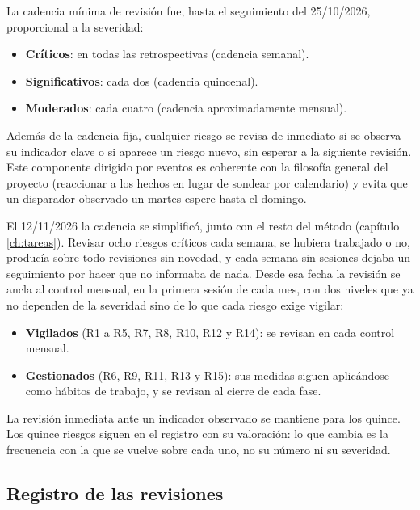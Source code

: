 La cadencia mínima de revisión fue, hasta el seguimiento del 25/10/2026, proporcional a la severidad:

\begin{itemize}
  \item \textbf{Críticos}: en todas las retrospectivas (cadencia semanal).
  \item \textbf{Significativos}: cada dos  (cadencia quincenal).
  \item \textbf{Moderados}: cada cuatro  (cadencia aproximadamente mensual).
\end{itemize}

Además de la cadencia fija, cualquier riesgo se revisa de inmediato si se observa su indicador clave o si aparece un riesgo nuevo, sin esperar a la siguiente revisión.
Este componente dirigido por eventos es coherente con la filosofía general del proyecto (reaccionar a los hechos en lugar de sondear por calendario) y evita que un disparador observado un martes espere hasta el domingo.

El 12/11/2026 la cadencia se simplificó, junto con el resto del método (capítulo \ref{ch:tareas}).
Revisar ocho riesgos críticos cada semana, se hubiera trabajado o no, producía sobre todo revisiones sin novedad, y cada semana sin sesiones dejaba un seguimiento por hacer que no informaba de nada.
Desde esa fecha la revisión se ancla al control mensual, en la primera sesión de cada mes, con dos niveles que ya no dependen de la severidad sino de lo que cada riesgo exige vigilar:

\begin{itemize}
  \item \textbf{Vigilados} (R1 a R5, R7, R8, R10, R12 y R14): se revisan en cada control mensual.
  \item \textbf{Gestionados} (R6, R9, R11, R13 y R15): sus medidas siguen aplicándose como hábitos de trabajo, y se revisan al cierre de cada fase.
\end{itemize}

La revisión inmediata ante un indicador observado se mantiene para los quince.
Los quince riesgos siguen en el registro con su valoración: lo que cambia es la frecuencia con la que se vuelve sobre cada uno, no su número ni su severidad.

\subsection{Registro de las revisiones}
\label{sec:riesgos-registro-revisiones}

